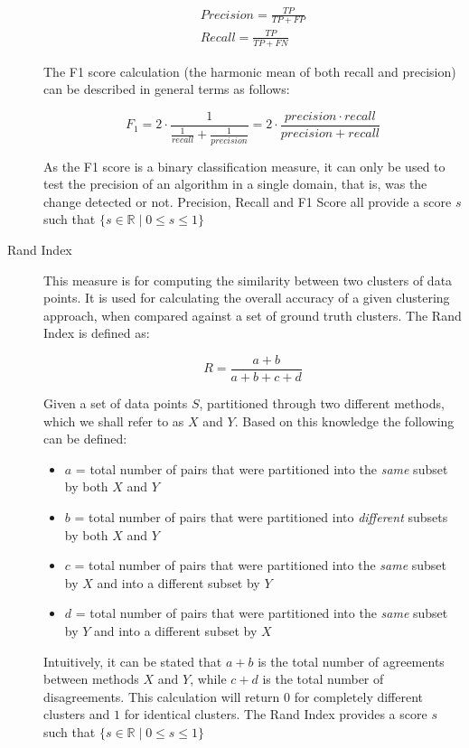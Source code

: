 \documentclass{uvamscse}	%
\begin{document}
\begin{description}
	\begin{eqnarray}
	    Precision = \frac{TP}{TP + FP}\\
	    Recall = \frac{TP}{TP + FN}
	\end{eqnarray}
	
	The F1 score calculation (the harmonic mean of both recall and precision) can be described in general terms as follows:

	\begin{equation}
		F_1 = 2 \cdot \frac{1}{\frac{1}{recall} + \frac{1}{precision}} = 2 \cdot \frac{precision \cdot recall}{precision+recall}
		\label{equ:F1}
	\end{equation}

	As the F1 score is a binary classification measure, it can only be used to test the precision of an algorithm in a single domain, that is, was the change detected or not. Precision, Recall and F1 Score all provide a score $s$ such that $ \{s\in\mathbb{R} \mid 0\leq s \leq 1\} $

	\item[Rand Index] This measure is for computing the similarity between two clusters of data points. It is used for calculating the overall accuracy of a given clustering approach, when compared against a set of ground truth clusters. The Rand Index is defined as:

	\begin{equation}
		R = \frac{a+b}{a+b+c+d}
	\end{equation}
	
	Given a set of data points $S$, partitioned through two different methods, which we shall refer to as $X$ and $Y$. Based on this knowledge the following can be defined:
	
	\begin{itemize}
		\item $a$ = total number of pairs that were partitioned into the \emph{same} subset by both $X$ and $Y$
		\item $b$ = total number of pairs that were partitioned into \emph{different} subsets by both $X$ and $Y$
		\item $c$ = total number of pairs that were partitioned into the \emph{same} subset by $X$ and into a different subset by $Y$
		\item $d$ = total number of pairs that were partitioned into the \emph{same} subset by $Y$ and into a different subset by $X$
	\end{itemize}
	
	Intuitively, it can be stated that $a+b$ is the total number of agreements between methods $X$ and $Y$, while $c+d$ is the total number of disagreements. This calculation will return $0$ for completely different clusters and $1$ for identical clusters. The Rand Index provides a score $s$ such that $ \{s\in\mathbb{R} \mid 0\leq s \leq 1\} $
	

\end{description}
\end{document}
